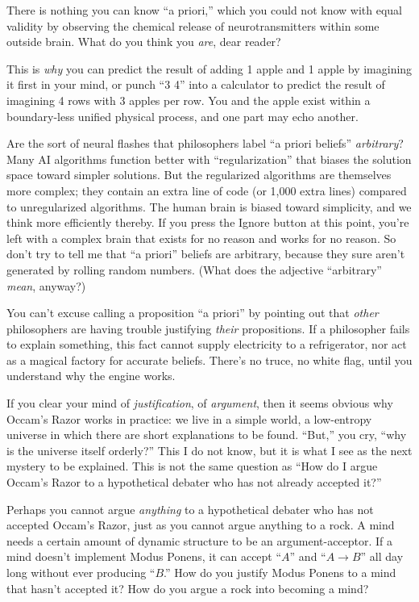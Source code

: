 {
 There is nothing you can know ``a
priori,'' which you could not know with equal
validity by observing the chemical release of neurotransmitters within
some outside brain. What do you think you \textit{are}, dear reader?}

{
 This is \textit{why} you can predict the result of adding 1 apple
and 1 apple by imagining it first in your mind, or punch
``3 {\texttimes} 4'' into a
calculator to predict the result of imagining 4 rows with 3 apples per
row. You and the apple exist within a boundary-less unified physical
process, and one part may echo another.}

{
 Are the sort of neural flashes that philosophers label
``a priori beliefs''
\textit{arbitrary}? Many AI algorithms function better with
``regularization'' that biases the
solution space toward simpler solutions. But the regularized algorithms
are themselves more complex; they contain an extra line of code (or
1,000 extra lines) compared to unregularized algorithms. The human
brain is biased toward simplicity, and we think more efficiently
thereby. If you press the Ignore button at this point,
you're left with a complex brain that exists for no
reason and works for no reason. So don't try to tell me
that ``a priori'' beliefs are
arbitrary, because they sure aren't generated by
rolling random numbers. (What does the adjective
``arbitrary'' \textit{mean},
anyway?)}

{
 You can't excuse calling a proposition
``a priori'' by pointing out that
\textit{other} philosophers are having trouble justifying
\textit{their} propositions. If a philosopher fails to explain
something, this fact cannot supply electricity to a refrigerator, nor
act as a magical factory for accurate beliefs. There's
no truce, no white flag, until you understand why the engine works.}

{
 If you clear your mind of \textit{justification}, of
\textit{argument}, then it seems obvious why Occam's
Razor works in practice: we live in a simple world, a low-entropy
universe in which there are short explanations to be found.
``But,'' you cry,
``why is the universe itself
orderly?'' This I do not know, but it is what I see
as the next mystery to be explained. This is not the same question as
``How do I argue Occam's Razor to a
hypothetical debater who has not already accepted
it?''}

{
 Perhaps you cannot argue \textit{anything} to a hypothetical
debater who has not accepted Occam's Razor, just as you
cannot argue anything to a rock. A mind needs a certain amount of
dynamic structure to be an argument-acceptor. If a mind
doesn't implement Modus Ponens, it can accept
``$A$'' and ``$A \rightarrow B$'' all day long without ever
producing ``$B$.'' How do you justify
Modus Ponens to a mind that hasn't accepted it? How do
you argue a rock into becoming a mind?}

